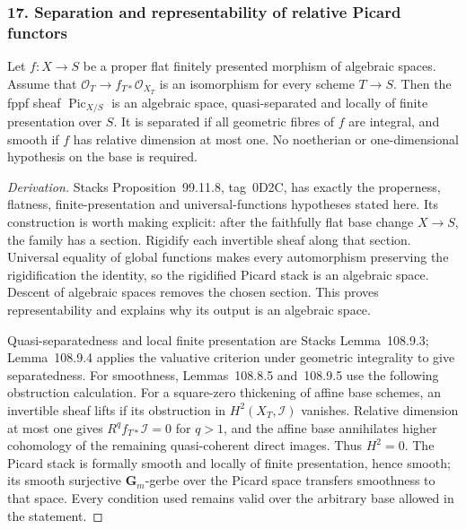 \subsubsection{17. Separation and representability of relative Picard functors}
\begin{theorem}\label{B:Picard-general}
Let $f:X\to S$ be a proper flat finitely presented morphism of algebraic spaces. Assume that $\mathcal O_T\to f_{T*}\mathcal O_{X_T}$ is an isomorphism for every scheme $T\to S$. Then the fppf sheaf $\operatorname{Pic}_{X/S}$ is an algebraic space, quasi-separated and locally of finite presentation over $S$. It is separated if all geometric fibres of $f$ are integral, and smooth if $f$ has relative dimension at most one. No noetherian or one-dimensional hypothesis on the base is required.
\end{theorem}
\begin{proof}[Derivation]
Stacks Proposition~99.11.8, tag~0D2C, has exactly the properness, flatness, finite-presentation and universal-functions hypotheses stated here. Its construction is worth making explicit: after the faithfully flat base change $X\to S$, the family has a section. Rigidify each invertible sheaf along that section. Universal equality of global functions makes every automorphism preserving the rigidification the identity, so the rigidified Picard stack is an algebraic space. Descent of algebraic spaces removes the chosen section. This proves representability and explains why its output is an algebraic space.

Quasi-separatedness and local finite presentation are Stacks Lemma~108.9.3; Lemma~108.9.4 applies the valuative criterion under geometric integrality to give separatedness. For smoothness, Lemmas~108.8.5 and~108.9.5 use the following obstruction calculation. For a square-zero thickening of affine base schemes, an invertible sheaf lifts if its obstruction in $H^2(X_T,\mathcal I)$ vanishes. Relative dimension at most one gives $R^qf_{T*}\mathcal I=0$ for $q>1$, and the affine base annihilates higher cohomology of the remaining quasi-coherent direct images. Thus $H^2=0$. The Picard stack is formally smooth and locally of finite presentation, hence smooth; its smooth surjective $\mathbf G_m$-gerbe over the Picard space transfers smoothness to that space. Every condition used remains valid over the arbitrary base allowed in the statement.
\end{proof}


